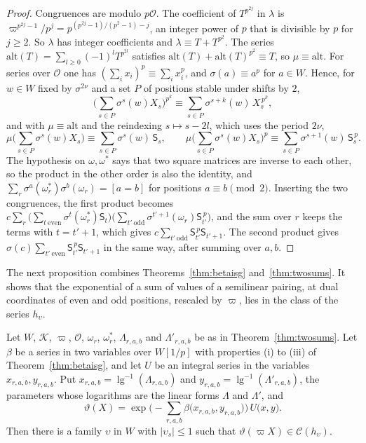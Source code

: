 \begin{proof}
Congruences are modulo $p\mathcal O$. The coefficient of $T^{p^{2j}}$ in $\lambda$ is $\varpi^{p^{2j}-1}/p^j=p^{(p^{2j}-1)/(p^2-1)-j}$, an integer power of $p$ that is divisible by $p$ for $j\ge2$. So $\lambda$ has integer coefficients and $\lambda\equiv T+T^{p^2}$. The series $\mathrm{alt}(T)=\sum_{l\ge0}(-1)^lT^{p^{2l}}$ satisfies $\mathrm{alt}(T)+\mathrm{alt}(T)^{p^2}\equiv T$, so $\mu\equiv\mathrm{alt}$. For series over $\mathcal O$ one has $(\sum_ix_i)^p\equiv\sum_ix_i^p$, and $\sigma(a)\equiv a^p$ for $a\in W$. Hence, for $w\in W$ fixed by $\sigma^{2\nu}$ and a set $P$ of positions stable under shifts by $2$,
\[
\Big(\sum_{s\in P}\sigma^s(w)X_s\Big)^{p^k}\equiv\sum_{s\in P}\sigma^{s+k}(w)\,X_s^{\,p^k},
\]
and with $\mu\equiv\mathrm{alt}$ and the reindexing $s\mapsto s-2l$, which uses the period $2\nu$,
\[
\mu\Big(\sum_{s\in P}\sigma^s(w)X_s\Big)\equiv\sum_{s\in P}\sigma^s(w)\,\mathsf S_s,\qquad\mu\Big(\sum_{s\in P}\sigma^s(w)X_s\Big)^p\equiv\sum_{s\in P}\sigma^{s+1}(w)\,\mathsf S_s^{\,p}.
\]
The hypothesis on $\omega,\omega^\ast$ says that two square matrices are inverse to each other, so the product in the other order is also the identity, and $\sum_r\sigma^a(\omega^\ast_r)\sigma^b(\omega_r)=[a=b]$ for positions $a\equiv b\pmod2$. Inserting the two congruences, the first product becomes $c\sum_r\big(\sum_{t\ \mathrm{even}}\sigma^t(\omega^\ast_r)\mathsf S_t\big)\big(\sum_{t'\ \mathrm{odd}}\sigma^{t'+1}(\omega_r)\mathsf S_{t'}^{\,p}\big)$, and the sum over $r$ keeps the terms with $t=t'+1$, which gives $c\sum_{t'\ \mathrm{odd}}\mathsf S_{t'}^{\,p}\mathsf S_{t'+1}$. The second product gives $\sigma(c)\sum_{t'\ \mathrm{even}}\mathsf S_{t'}^{\,p}\mathsf S_{t'+1}$ in the same way, after summing over $a,b$.
\end{proof}

The next proposition combines Theorems~\ref{thm:betaisg} and~\ref{thm:twosums}. It shows that the exponential of a sum of values of a semilinear pairing, at dual coordinates of even and odd positions, rescaled by $\varpi$, lies in the class of the series $h_\upsilon$.

\begin{proposition}\label{prop:inclass}
Let $W$, $\mathcal K$, $\varpi$, $\mathcal O$, $\omega_r$, $\omega_r^\ast$, $\Lambda_{r,a,b}$ and $\Lambda'_{r,a,b}$ be as in Theorem~\ref{thm:twosums}. Let $\beta$ be a series in two variables over $W[1/p]$ with properties (i) to (iii) of Theorem~\ref{thm:betaisg}, and let $U$ be an integral series in the variables $x_{r,a,b},y_{r,a,b}$. Put $x_{r,a,b}=\operatorname{lg}^{-1}(\Lambda_{r,a,b})$ and $y_{r,a,b}=\operatorname{lg}^{-1}(\Lambda'_{r,a,b})$, the parameters whose logarithms are the linear forms $\Lambda$ and $\Lambda'$, and
\[
\vartheta(X)=\exp\Big(-\sum_{r,a,b}\beta\big(x_{r,a,b},y_{r,a,b}\big)\Big)\,U\big(x,y\big).
\]
Then there is a family $\upsilon$ in $W$ with $\lvert\upsilon_s\rvert\le1$ such that $\vartheta(\varpi X)\in\mathcal C(h_\upsilon)$.
\end{proposition}

